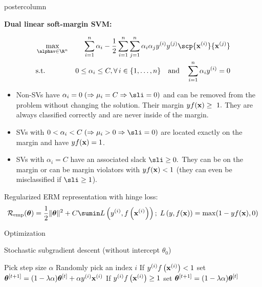 \documentclass{beamer}
\newlength{\columnheight} %
\begin{document}
\begin{frame}[fragile]{}
\begin{columns}

\begin{column}{.31\textwidth}
\begin{beamercolorbox}[center]{postercolumn}
\begin{minipage}{.98\textwidth}
\parbox[t][\columnheight]{\textwidth}{

  \begin{myblock}{}

							
						\begin{codebox}
							\textbf{Dual linear soft-margin SVM:} 	
						\end{codebox}
							\begin{eqnarray*}
								& \max\limits_{\alphav \in \R^n} & \sum_{i=1}^n \alpha_i - \frac{1}{2}\sum_{i=1}^n\sum_{j=1}^n\alpha_i\alpha_j\yi y^{(j)} \scp{\xi}{\xv^{(j)}} \\
								& \text{s.t. } & 0 \le \alpha_i \le C, \forall\, i \in \nset \quad \text{and} \quad  \sum_{i=1}^n \alpha_i \yi = 0
							\end{eqnarray*}

        \begin{itemize}[$\bullet$]
      \setlength{\itemindent}{+.3in}
    \item Non-SVs have $\alpha_i = 0\; (\Rightarrow \mu_i = C \Rightarrow \sli = 0)$ and can be
    removed from the problem without changing the solution. Their margin $yf(\mathbf{x}) \geq ~ 1.$ 
    They are always classified correctly and are never inside of the margin. 
    
    \item SVs with $0 < \alpha_i < C\; (\Rightarrow \mu_i > 0 \Rightarrow \sli = 0)$ are located exactly on the
    margin and have $yf(\mathbf{x})=1$. 
    \item SVs with $\alpha_i = C$ have an associated
     slack $\sli \geq 0.$ They can be on the margin or can be margin violators with $yf(\mathbf{x}) < 1$ (they can even be misclassified if $\sli \geq 1$).
\end{itemize}
        
Regularized ERM representation with hinge loss:
$$ \risket = \frac{1}{2} \|\thetav\|^2 + C \sumin \Lxyi ;\; \Lxy = \max(1-y\fx, 0)$$
  
\end{myblock}

\begin{myblock}{Optimization}
  \begin{algorithm}[H]
  \caption{Stochastic subgradient descent (without intercept $\theta_0$)}
  \begin{algorithmic}[1]
      \State Pick step size $\alpha$
      \State Randomly pick an index $i$
      \State If $y^{(i)} f\left(\mathbf{x}^{(i)}\right) < 1$ set $\bm{\theta}^{[t +1]} = (1 - \lambda \alpha) \bm{\theta}^{[t]} + \alpha y^{(i)} \mathbf{x}^{(i)}$ 
      \State If $y^{(i)} f\left(\mathbf{x}^{(i)}\right) \geq 1$ set $\bm{\theta}^{[t +1]} = (1 - \lambda \alpha) \bm{\theta}^{[t]}$ 
      \EndFor
  \end{algorithmic}
\end{algorithm}


\end{myblock}}
\end{minipage}
\end{beamercolorbox}
\end{column}
\end{columns}
\end{frame}
\end{document}
